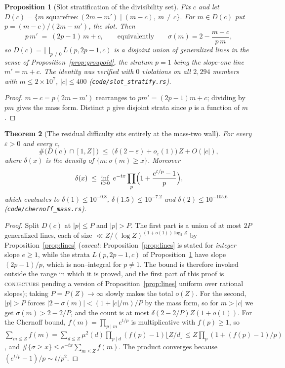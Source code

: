 \documentclass[11pt]{article}
\newtheorem{theorem}{Theorem}[section]
\newtheorem{proposition}[theorem]{Proposition}
\theoremstyle{definition}
\begin{document}
\begin{proposition}[Slot stratification of the divisibility set]\label{prop:slotstrat}
Fix $c$ and let $D(c)=\{m \text{ squarefree}: (2m-m')\mid(m-c),\ m\neq c\}$. For $m\in D(c)$ put
$p=(m-c)/(2m-m')$, the \emph{slot}. Then
\[ p\,m' \;=\; (2p-1)\,m + c, \qquad\text{equivalently}\qquad \sigma(m)=2-\frac{m-c}{p\,m}, \]
so $D(c)=\bigsqcup_{p\neq0} L(p,2p-1,c)$ is a disjoint union of generalized lines in the sense of
Proposition~\textup{\ref{prop:groupoid}}, the stratum $p=1$ being the slope-\emph{one} line
$m'=m+c$. The identity was verified with $0$ violations on all $2{,}294$ members with
$m\le2\times10^7$, $|c|\le400$ \textup{(\texttt{code/slot\_stratify.rs})}.
\end{proposition}
\begin{proof}
$m-c=p(2m-m')$ rearranges to $pm'=(2p-1)m+c$; dividing by $pm$ gives the mass form. Distinct $p$
give disjoint strata since $p$ is a function of $m$.
\end{proof}

\begin{theorem}[The residual difficulty sits entirely at the mass-two wall]\label{thm:masstwo}
For every $\varepsilon>0$ and every $c$,
\[ \#\bigl(D(c)\cap[1,Z]\bigr)\;\le\;\bigl(\delta(2-\varepsilon)+o_\varepsilon(1)\bigr)\,Z+O(|c|), \]
where $\delta(x)$ is the density of $\{m:\sigma(m)\ge x\}$. Moreover
\[ \delta(x)\;\le\;\inf_{t>0}\;e^{-tx}\prod_{p}\Bigl(1+\frac{e^{t/p}-1}{p}\Bigr), \]
which evaluates to $\delta(1)\le10^{-0.8}$, $\delta(1.5)\le10^{-7.2}$ and
$\delta(2)\le10^{-105.6}$ \textup{(\texttt{code/chernoff\_mass.rs})}.
\end{theorem}
\begin{proof}
Split $D(c)$ at $|p|\le P$ and $|p|>P$. The first part is a union of at most $2P$ generalized lines,
each of size $\ll Z/(\log Z)^{(1+o(1))\log_3 Z}$ by Proposition~\ref{prop:lines}
\textup{(}\emph{caveat}: Proposition~\ref{prop:lines} is stated for \emph{integer} slope $e\ge1$,
while the strata $L(p,2p-1,c)$ of Proposition~\ref{prop:slotstrat} have slope $(2p-1)/p$, which is
non--integral for $p\ne1$. The bound is therefore invoked outside the range in which it is proved,
and the first part of this proof is \textsc{conjecture} pending a version of
Proposition~\ref{prop:lines} uniform over rational slopes\textup{)}; taking
$P=P(Z)\to\infty$ slowly makes the total $o(Z)$. For the second, $|p|>P$ forces
$|2-\sigma(m)|<(1+|c|/m)/P$ by the mass form, so for $m>|c|$ we get $\sigma(m)>2-2/P$, and the count
is at most $\delta(2-2/P)Z(1+o(1))$. For the Chernoff bound, $f(m)=\prod_{p\mid m}e^{t/p}$ is
multiplicative with $f(p)\ge1$, so
$\sum_{m\le Z}f(m)=\sum_{d\le Z}\mu^2(d)\prod_{p\mid d}(f(p)-1)\lfloor Z/d\rfloor
\le Z\prod_p(1+(f(p)-1)/p)$, and $\#\{\sigma\ge x\}\le e^{-tx}\sum_{m\le Z}f(m)$.
The product converges because $(e^{t/p}-1)/p\sim t/p^2$.
\end{proof}
\end{document}
